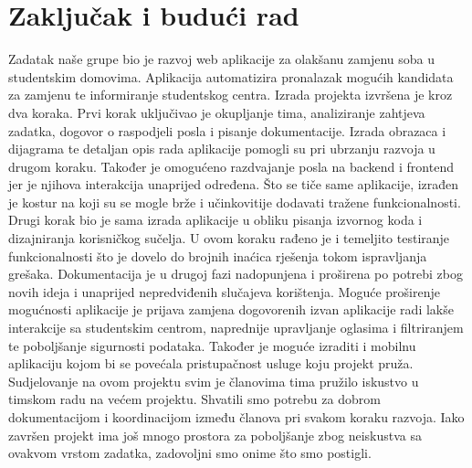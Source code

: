 \chapter{Zaključak i budući rad}
		
		
		
Zadatak naše grupe bio je razvoj web aplikacije za olakšanu zamjenu soba u studentskim domovima. Aplikacija automatizira pronalazak mogućih kandidata za zamjenu te informiranje studentskog centra. Izrada projekta izvršena je kroz dva koraka.
Prvi korak uključivao je okupljanje tima, analiziranje zahtjeva zadatka, dogovor o raspodjeli posla i pisanje dokumentacije. Izrada obrazaca i dijagrama te detaljan opis rada aplikacije pomogli su pri ubrzanju razvoja u drugom koraku. Također je omogućeno razdvajanje posla na backend i frontend jer je njihova interakcija unaprijed određena. Što se tiče same aplikacije, izrađen je kostur na koji su se mogle brže i učinkovitije dodavati tražene funkcionalnosti.
Drugi korak bio je sama izrada aplikacije u obliku pisanja izvornog koda i dizajniranja korisničkog sučelja. U ovom koraku rađeno je i temeljito testiranje funkcionalnosti što je dovelo do brojnih inaćica rješenja tokom ispravljanja grešaka. Dokumentacija je u drugoj fazi nadopunjena i proširena po potrebi zbog novih ideja i unaprijed nepredviđenih slučajeva korištenja.
Moguće proširenje mogućnosti aplikacije je prijava zamjena dogovorenih izvan aplikacije radi lakše interakcije sa studentskim centrom, naprednije upravljanje oglasima i filtriranjem te poboljšanje sigurnosti podataka. Također je moguće izraditi i mobilnu aplikaciju kojom bi se povećala pristupačnost usluge koju projekt pruža.
Sudjelovanje na ovom projektu svim je članovima tima pružilo iskustvo u timskom radu na većem projektu. Shvatili smo potrebu za dobrom dokumentacijom i koordinacijom između članova pri svakom koraku razvoja. Iako završen projekt ima još mnogo prostora za poboljšanje zbog neiskustva sa ovakvom vrstom zadatka, zadovoljni smo onime što smo postigli.

		
		
		\eject 